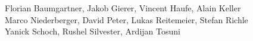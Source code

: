 %
%
%
Florian Baumgartner,	%
Jakob Gierer,		%
Vincent Haufe,		%
Alain Keller		%
\\
Marco Niederberger,	%
David Peter,		%
Lukas Reitemeier,	%
Stefan Richle          %
\\
Yanick Schoch,		%
Rushel Silvester,
Ardijan Tosuni		%
